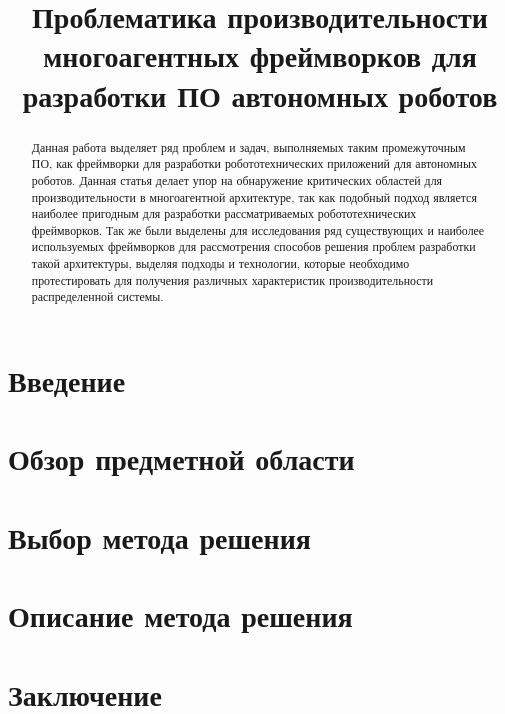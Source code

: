 \documentclass[conference]{IEEEtran}
\begin{document}
	\title{Проблематика производительности многоагентных фреймворков для разработки ПО автономных роботов}
	\author{
	}

	\maketitle
	\begin{abstract}
		Данная работа выделяет ряд проблем и задач, выполняемых таким промежуточным ПО, как фреймворки для разработки робототехнических приложений для автономных роботов. Данная статья делает упор на обнаружение критических областей для производительности в многоагентной архитектуре, так как подобный подход является наиболее пригодным для разработки рассматриваемых робототехнических фреймворков. Так же были выделены для исследования ряд существующих и наиболее используемых  фреймворков для рассмотрения способов решения проблем разработки такой архитектуры, выделяя подходы и технологии, которые необходимо протестировать для получения различных характеристик производительности распределенной системы.
	\end{abstract}

	\section{Введение}
		
	\section{Обзор предметной области }
		
	\section{Выбор метода решения}
		
	\section{Описание метода решения}
		
	\section{Заключение}
		
		
	\printbibliography
\end{document}
